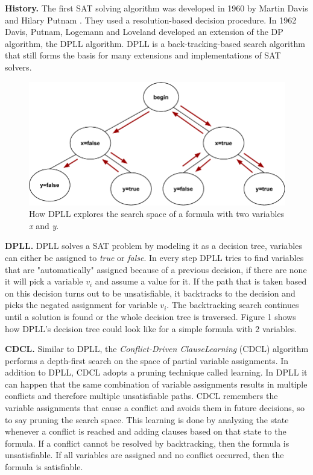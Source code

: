 \documentclass[letterpaper]{article}
\newcommand{\mypar}[1]{{\bf #1.}}
\begin{document}
\mypar{History}
The first SAT solving algorithm was developed in 1960 by Martin Davis and Hilary Putnam \cite{dp}.
They used a resolution-based decision procedure.
In 1962 Davis, Putnam, Logemann and Loveland developed an extension of the DP algorithm, the DPLL algorithm.
DPLL is a back-tracking-based search algorithm that still forms the basis for many extensions and implementations of SAT solvers.
\begin{figure}
	\centering
	\includegraphics[width=\columnwidth]{figures/dpll_branching.pdf}
	\caption{How DPLL explores the search space of a formula with two variables \textit{x} and \textit{y}.
		\label{fig:dpll-branching}}
\end{figure}

\mypar{DPLL}
DPLL solves a SAT problem by modeling it as a decision tree, variables can either be assigned to \textit{true} or \textit{false}.
In every step DPLL tries to find variables that are "automatically" assigned because of a previous decision,
if there are none it will pick a variable $v_i$ and assume a value for it.
If the path that is taken based on this decision turns out to be unsatisfiable, it backtracks to the decision and picks the negated assignment for variable $v_i$.
The backtracking search continues until a solution is found or the whole decision tree is traversed.
Figure 1 shows how DPLL's decision tree could look like for a simple formula with 2 variables.

\mypar{CDCL}
Similar to DPLL, the \textit{Conflict-Driven Clause}\linebreak\textit{Learning} (CDCL) algorithm performs a depth-first search on the space of partial variable assignments.
In addition to DPLL, CDCL adopts a pruning technique called learning.
In DPLL it can happen that the same combination of variable assignments results in multiple conflicts and therefore multiple unsatisfiable paths.
CDCL remembers the variable assignments that cause a conflict and avoids them in future decisions, so to say pruning the search space.
This learning is done by analyzing the state whenever a conflict is reached and adding clauses based on that state to the formula.
If a conflict cannot be resolved by backtracking, then the formula is unsatisfiable.
If all variables are assigned and no conflict occurred, then the formula is satisfiable.
\end{document}
